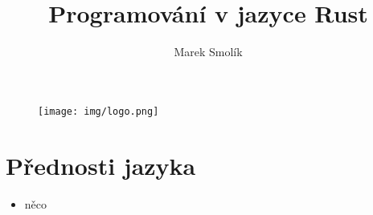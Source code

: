 \documentclass{beamer}
\author{Marek Smolík}
\title{Programování v jazyce Rust}
\institute{Střední škola spojů a informatiky Tábor, Bydlinského 2474}
\date{}
\begin{document}
\begin{frame}
    \titlepage
    \begin{figure}[htpb]
        \begin{center}
            \texttt{[image: img/logo.png]}
        \end{center}
    \end{figure}
\end{frame}


\section{Přednosti jazyka}
\begin{frame}
    \begin{itemize}
        \item něco
    \end{itemize}
\end{frame}
\end{document}
